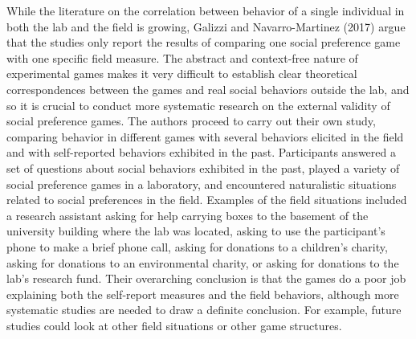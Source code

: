 \documentclass{article}
\begin{document}
 
While the literature on the correlation between behavior of a single individual in both the lab and the field is growing, Galizzi and Navarro-Martinez (2017) argue that the studies only report the results of comparing one social preference game with one specific field measure. The abstract and context-free nature of experimental games makes it very difficult to establish clear theoretical correspondences between the games and real social behaviors outside the lab, and so it is crucial to conduct more systematic research on the external validity of social preference games. The authors proceed to carry out their own study, comparing behavior in different games with several behaviors elicited in the field and with self-reported behaviors exhibited in the past. Participants answered a set of questions about social behaviors exhibited in the past, played a variety of social preference games in a laboratory, and encountered naturalistic situations related to social preferences in the field. Examples of the field situations included a research assistant asking for help carrying boxes to the basement of the university building where the lab was located, asking to use the participant\rq s phone to make a brief phone call, asking for donations to a children\rq s charity, asking for donations to an environmental charity, or asking for donations to the lab\rq s research fund.  Their overarching conclusion is that the games do a poor job explaining both the self-report measures and the field behaviors, although more systematic studies are needed to draw a definite conclusion. For example, future studies could look at other field situations or other game structures. \\
\end{document}
